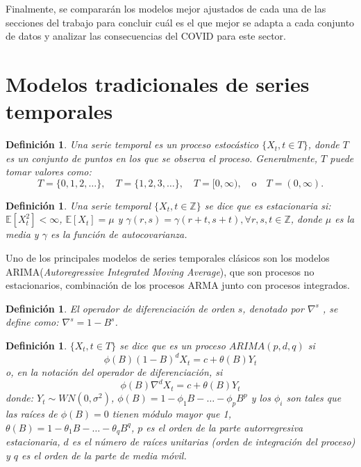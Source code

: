 \documentclass[12pt,twoside]{article}
\newtheorem{definition}[theorem]{Definición}
\begin{document}
Finalmente, se compararán los modelos mejor ajustados de cada una de las secciones del trabajo para concluir cuál es el que mejor se adapta a cada conjunto de datos y analizar las consecuencias del COVID para este sector. 



\newpage
\section{Modelos tradicionales de series temporales}\label{sec:34}

\begin{definition}
Una serie temporal \cite{sarima1} es un proceso estocástico $\{X_t, t \in T\}$, donde $T$ es un conjunto de puntos en los que se observa el proceso. Generalmente, $T$ puede tomar valores como:
\begin{equation}
T = \{0, 1, 2, \dots\}, \quad T = \{1, 2, 3, \dots\}, \quad T = [0, \infty), \quad \text{o} \quad T = (0, \infty).
\end{equation}
\end{definition}

\begin{definition}
Una serie temporal $\{X_t, t \in \mathbb{Z}\}$ se dice que es estacionaria si: $\mathbb{E}[X_t^2] < \infty$, $\mathbb{E}[X_t] = \mu$ y $\gamma(r, s) = \gamma(r + t, s + t), \forall r, s, t \in \mathbb{Z}$, donde $\mu$ es la media y $\gamma$ es la función de autocovarianza.
\end{definition}

Uno de los principales modelos de series temporales clásicos son los modelos ARIMA(\textit{Autoregressive Integrated Moving Average}), que son procesos no estacionarios, combinación de los procesos ARMA junto con procesos integrados.

\begin{definition}El operador de diferenciación de orden $s$, denotado por $\nabla^s$ , se define como: $\nabla^s = 1 - B^s$.
\end{definition}


\begin{definition}
$\{X_t, t \in T\}$ se dice que es un proceso $ARIMA(p,d,q)$ si  
\begin{equation}
\phi(B)(1 - B)^d X_t = c + \theta(B) Y_t
\end{equation}
o, en la notación del operador de diferenciación, si  
\begin{equation}
\phi(B) \nabla^d X_t = c + \theta(B) Y_t
\end{equation}
donde: $Y_t \sim WN(0, \sigma^2)$, $\phi(B) = 1 - \phi_1 B - \dots - \phi_p B^p$ y los \( \phi_i \) son tales que las raíces de $\phi(B) = 0$ tienen módulo mayor que 1, $\theta(B) = 1 - \theta_1 B - \dots - \theta_q B^q$, $p$ es el orden de la parte autorregresiva estacionaria, $d$ es el número de raíces unitarias (orden de integración del proceso) y $q$ es el orden de la parte de media móvil.
\end{definition}
\end{document}
